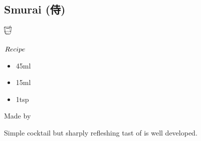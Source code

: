 \subsection{Smurai (侍)}
\vspace{-7mm}
\hspace{35mm}
\includegraphics[width=4mm]{cocktail_glass_rock.png}
\vspace{2.5mm}
\begin{itembox}[l]{\boldmath $Recipe$}
\begin{itemize}
\setlength{\parskip}{0cm}
\setlength{\itemsep}{0cm}
\item \sake 45ml
\item \limj 15ml
\item \lj 1tsp
\end{itemize}
\vspace{-4mm}
Made by \stir
\end{itembox}
Simple cocktail but sharply refleshing tast of \sake is well developed.
